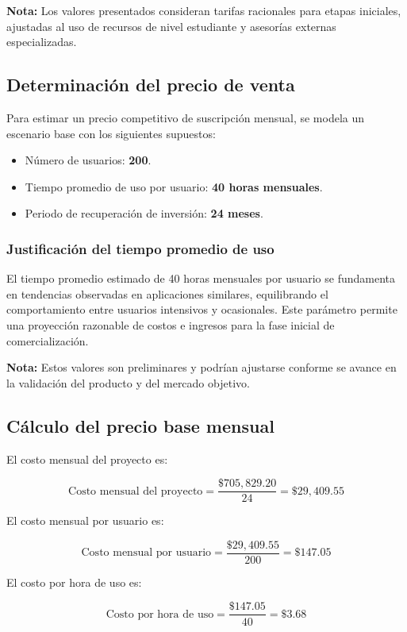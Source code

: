 \noindent \textbf{Nota:} Los valores presentados consideran tarifas racionales para etapas iniciales, ajustadas al uso de recursos de nivel estudiante y asesorías externas especializadas.

\subsection{Determinación del precio de venta}

Para estimar un precio competitivo de suscripción mensual, se modela un escenario base con los siguientes supuestos:

\begin{itemize}
	\item Número de usuarios: \textbf{200}.
	\item Tiempo promedio de uso por usuario: \textbf{40 horas mensuales}.
	\item Periodo de recuperación de inversión: \textbf{24 meses}.
\end{itemize}

\subsubsection{Justificación del tiempo promedio de uso}

El tiempo promedio estimado de 40 horas mensuales por usuario se fundamenta en tendencias observadas en aplicaciones similares, equilibrando el comportamiento entre usuarios intensivos y ocasionales. Este parámetro permite una proyección razonable de costos e ingresos para la fase inicial de comercialización.

\noindent \textbf{Nota:} Estos valores son preliminares y podrían ajustarse conforme se avance en la validación del producto y del mercado objetivo.

\subsection{Cálculo del precio base mensual}

El costo mensual del proyecto es:

\[
\text{Costo mensual del proyecto} = \frac{\$705,829.20}{24} = \$29,409.55
\]

El costo mensual por usuario es:

\[
\text{Costo mensual por usuario} = \frac{\$29,409.55}{200} = \$147.05
\]

El costo por hora de uso es:

\[
\text{Costo por hora de uso} = \frac{\$147.05}{40} = \$3.68
\]

